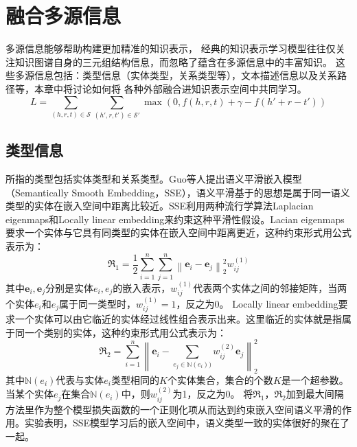 \documentclass[twocolumn]{article}
\author{\zihao{-4} \songti xxx}
\date{}
\begin{document}
	\section{融合多源信息}
	多源信息能够帮助构建更加精准的知识表示，
	经典的知识表示学习模型往往仅关注知识图谱自身的三元组结构信息，而忽略了蕴含在多源信息中的丰富知识。
	这些多源信息包括：类型信息（实体类型，关系类型等），文本描述信息以及关系路径等，本章中将讨论如何将
	各种外部融合进知识表示空间中共同学习。
	\begin{equation}
		L=\sum_{(h,r,t)\in \mathcal{S}}\sum_{(h',r,t')\in \mathcal{S}'}\max (0,f(h,r,t)+\gamma-f(h'+r-t'))
	\end{equation}
	\subsection{类型信息}
	所指的类型包括实体类型和关系类型。Guo等人\cite{SSE}提出语义平滑嵌入模型（Semantically Smooth Embedding，SSE），语义平滑基于的思想是属于同一语义类型的实体在嵌入空间中距离比较近。SSE利用两种流行学算法Laplacian eigenmaps和Locally linear embedding来约束这种平滑性假设。Lacian eigenmaps要求一个实体与它具有同类型的实体在嵌入空间中距离更近，这种约束形式用公式表示为：
	\begin{equation}
		\Re_1 =\frac{1}{2}\sum_{i=1}^{n}\sum_{j=1}^{n}\left \| \textbf{e}_i-\textbf{e}_j \right \|_2^2w_{ij}^{(1)}
	\end{equation}
	其中$\textbf{e}_i,\textbf{e}_j$分别是实体$e_i,e_j$的嵌入表示，$w_{ij}^{(1)}$代表两个实体之间的邻接矩阵，当两个实体$e_i$和$e_j$属于同一类型时，$w_{ij}^{(1)}=1$，反之为0。
	Locally linear embedding要求一个实体可以由它临近的实体经过线性组合表示出来。这里临近的实体就是指属于同一个类别的实体，这种约束形式用公式表示为：
	\begin{equation}
	\Re_2=\sum_{i=1}^{n}\left \| \textbf{e}_i-\sum _{e_j\in \mathbb{N}(e_i))}w_{ij}^{(2)}\textbf{e}_j \right \|_2^2
	\end{equation}
	其中$\mathbb{N}(e_i)$代表与实体$e_i$类型相同的$K$个实体集合，集合的个数$K$是一个超参数。
	当某个实体$e_j$在集合$\mathbb{N}(e_i)$中，则$w_{ij}^{(2)}$为1，反之为0。
	将$\Re_1，\Re_2$加到最大间隔方法里作为整个模型损失函数的一个正则化项从而达到约束嵌入空间语义平滑的作用。实验表明，SSE模型学习后的嵌入空间中，语义类型一致的实体很好的聚在了一起。
	
\end{document}
